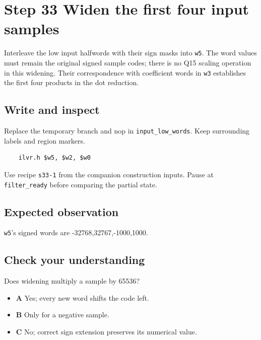 \section{Step 33 Widen the first four input samples}\label{fir-s33}

Interleave the low input halfwords with their sign masks into \texttt{w5}. The word values must remain the original signed sample codes; there is no Q15 scaling operation in this widening. Their correspondence with coefficient words in \texttt{w3} establishes the first four products in the dot reduction.

\subsection{Write and inspect}
Replace the temporary branch and nop in \texttt{input\_low\_words}. Keep surrounding labels and region markers.

\begin{verbatim}
    ilvr.h $w5, $w2, $w0
\end{verbatim}
Use recipe \texttt{s33-1} from the companion construction inputs. Pause at \texttt{filter\_ready} before comparing the partial state.

\subsection{Expected observation}
\texttt{w5}’s signed words are -32768,32767,-1000,1000.

\subsection{Check your understanding}
Does widening multiply a sample by 65536?

\begin{itemize}
  \item \textbf{A} Yes; every new word shifts the code left.
  \item \textbf{B} Only for a negative sample.
  \item \textbf{C} No; correct sign extension preserves its numerical value.
\end{itemize}
